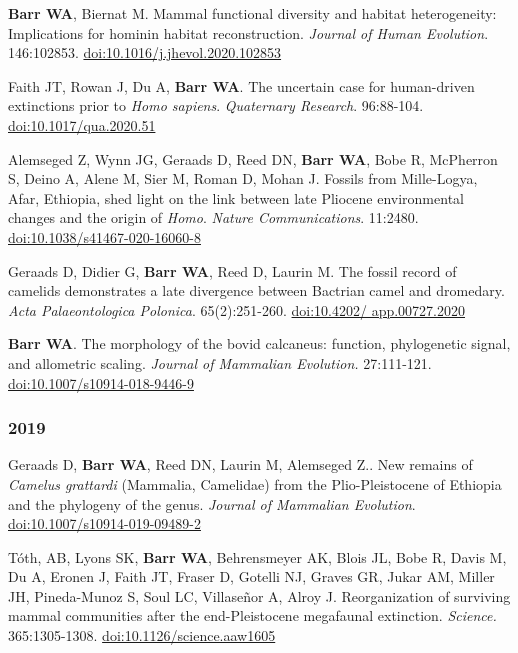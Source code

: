 \item {\bfseries Barr WA}, Biernat M. Mammal functional diversity and habitat heterogeneity: Implications for hominin habitat reconstruction. \emph{Journal of Human Evolution}. 146:102853. \href{https://dx.doi.org/10.1016/j.jhevol.2020.102853}{doi:10.1016/j.jhevol.2020.102853}

\item Faith JT, Rowan J, Du A, {\bfseries Barr WA}. The uncertain case for human-driven extinctions prior to \emph{Homo sapiens}. \emph{Quaternary Research}. 96:88-104. \href{https://dx.doi.org/10.1017/qua.2020.51}{doi:10.1017/qua.2020.51}

\item Alemseged Z, Wynn JG, Geraads D, Reed DN, {\bfseries Barr WA}, Bobe R, McPherron S, Deino A, Alene M, Sier M, Roman D,  Mohan J. Fossils from Mille-Logya, Afar, Ethiopia, shed light on the link between late Pliocene environmental changes and the origin of \emph{Homo}. \emph{Nature Communications}. 11:2480. \href{https://doi.org/10.1038/s41467-020-16060-8 }{doi:10.1038/s41467-020-16060-8}

\item Geraads D, Didier G, {\bfseries Barr WA}, Reed D, Laurin M. The fossil record of camelids demonstrates a late divergence between Bactrian camel and dromedary. \emph{Acta Palaeontologica Polonica}. 65(2):251-260. \href{https://doi.org/10.4202/app.00727.2020}{doi:10.4202/ app.00727.2020}

\item {\bfseries Barr WA}. The morphology of the bovid calcaneus: function, phylogenetic signal, and allometric scaling. \emph{Journal of Mammalian Evolution.}  27:111-121. \href{https://dx.doi.org/10.1007/s10914-018-9446-9}{doi:10.1007/s10914-018-9446-9}

\subsubsection*{2019}

\item Geraads D, {\bfseries Barr WA}, Reed DN, Laurin M, Alemseged Z.. New remains of \emph{Camelus grattardi} (Mammalia, Camelidae) from the Plio-Pleistocene of Ethiopia and the phylogeny of the genus. \emph{Journal of Mammalian Evolution}. \href{https://doi.org/10.1007/s10914-019-09489-2}{doi:10.1007/s10914-019-09489-2}

\item Tóth, AB, Lyons SK, {\bfseries Barr WA}, Behrensmeyer AK, Blois JL, Bobe R, Davis M, Du A, Eronen J, Faith JT, Fraser D, Gotelli NJ, Graves GR, Jukar AM, Miller JH, Pineda-Munoz S, Soul LC, Villaseñor A, Alroy J. Reorganization of surviving mammal communities after the end-Pleistocene megafaunal extinction. \emph{Science.} 365:1305-1308. \href{https://dx.doi.org/10.1126/science.aaw1605 }{doi:10.1126/science.aaw1605}

